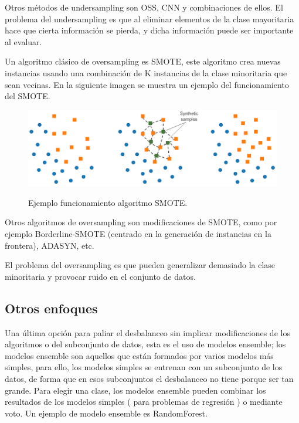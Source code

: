 Otros métodos de undersampling son OSS, CNN y combinaciones de ellos. El problema del undersampling es que al eliminar elementos de la clase mayoritaria hace que cierta información se pierda, y dicha información puede ser importante al evaluar.\newline

Un algoritmo clásico de oversampling es SMOTE, este algoritmo crea nuevas instancias usando una combinación de K instancias de la clase minoritaria que sean vecinas. En la siguiente imagen se muestra un ejemplo del funcionamiento del SMOTE.\newline

\begin{figure}[h]
	\centering
	\includegraphics[width=120mm]{imagenes/smote-example.png}
	\label{fig:8}
	\caption{Ejemplo funcionamiento algoritmo SMOTE.}
\end{figure}
\verticalspace

Otros algoritmos de oversampling son modificaciones de SMOTE, como por ejemplo Borderline-SMOTE (centrado en la generación de instancias en la frontera), ADASYN, etc.\newline

El problema del oversampling es que pueden generalizar demasiado la clase minoritaria y provocar ruido en el conjunto de datos.

\subsection{Otros enfoques}
Una última opción para paliar el desbalanceo sin implicar modificaciones de los algoritmos o del subconjunto de datos, esta es el uso de modelos ensemble; los modelos ensemble son aquellos que están formados por varios modelos más simples, para ello, los modelos simples se entrenan con un subconjunto de los datos, de forma que en esos subconjuntos el desbalanceo no tiene porque ser tan grande. Para elegir una clase, los modelos ensemble pueden combinar los resultados de los modelos simples ( para problemas de regresión ) o mediante voto. Un ejemplo de modelo ensemble es RandomForest.